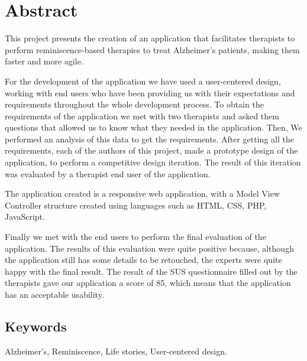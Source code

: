 
\chapter*{Abstract}

This project presents the creation of an application that facilitates therapists to perform reminiscence-based therapies to treat Alzheimer's patients, making them faster and more agile.  

For the development of the application we have used a user-centered design, working with end users who have been providing us with their expectations and requirements throughout the whole development process. To obtain the requirements of the application we met with two therapists and asked them questions that allowed us to know what they needed in the application. Then, We performed an analysis of this data to get the requirements. 
After getting all the requirements, each of the authors of this project, made a prototype design of the application, to perform a competitive design iteration. The result of this iteration was evaluated by a therapist end user of the application.

The application created is a responsive web application, with a Model View Controller structure created using languages such as HTML, CSS, PHP, JavaScript.

Finally we met with the end users to perform the final evaluation of the application. The results of this evaluation were quite positive because, although the application still has some details to be retouched, the experts were quite happy with the final result. The result of the SUS questionnaire filled out by the therapists gave our application a score of 85, which means that the application has an acceptable usability.


\section*{Keywords}

\noindent Alzheimer's, Reminiscence, Life stories, User-centered design.



